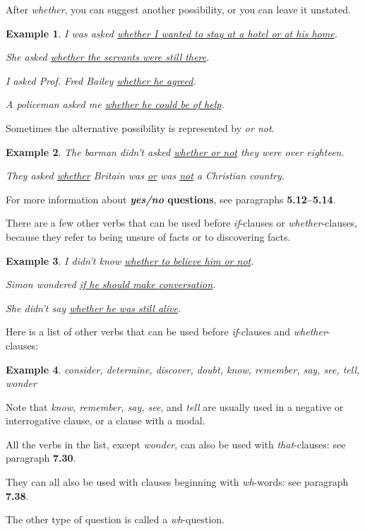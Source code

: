 \documentclass[oneside]{book}
\numberwithin{equation}{section}
\newtheorem{example}{Example}[section]
\begin{document}
After \textit{whether}, you can suggest another possibility, or you can leave it unstated.
\begin{example}
    I was asked \underline{whether I wanted to stay at a hotel or at his home}.
    
    She asked \underline{whether the servants were still there}.
    
    I asked Prof. Fred Bailey \underline{whether he agreed}.
    
    A policeman asked me \underline{whether he could be of help}.
\end{example}
Sometimes the alternative possibility is represented by \textit{or not}.
\begin{example}
    The barman didn't asked \underline{whether or not} they were over eighteen.
    
    They asked \underline{whether} Britain was \underline{or} was \underline{not} a Christian country.
\end{example}
For more information about \textbf{\textit{yes/no} questions}, see paragraphs \textbf{5.12--5.14}.

%
\noindent{} There are a few other verbs that can be used before \textit{if}-clauses or \textit{whether}-clauses, because they refer to being unsure of facts or to discovering facts.
\begin{example}
    I didn't know \underline{whether to believe him or not}.
    
    Simon wondered \underline{if he should make conversation}.
    
    She didn't say \underline{whether he was still alive}.
\end{example}
Here is a list of other verbs that can be used before \textit{if}-clauses and \textit{whether}-clauses:
\begin{example}
    consider, determine, discover, doubt, know, remember, say, see, tell, wonder
\end{example}
Note that \textit{know, remember, say, see}, and \textit{tell} are usually used in a negative or interrogative clause, or a clause with a modal.

%
All the verbs in the list, except \textit{wonder}, can also be used with \textit{that}-clauses: see paragraph \textbf{7.30}.

They can all also be used with clauses beginning with \textit{wh}-words: see paragraph \textbf{7.38}.

%
\noindent{} The other type of question is called a \textit{wh}-question.
\end{document}
